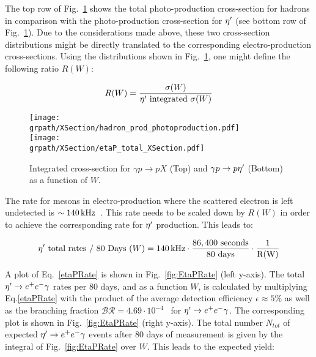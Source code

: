 The top row of Fig.~\ref{fig:EtaPProdX} shows the total photo-production cross-section for hadrons in comparison with the photo-production cross-section for $\eta^{\prime}$ (see bottom row of Fig.~\ref{fig:EtaPProdX}). Due to the considerations made above, these two cross-section distributions might be directly translated to the corresponding electro-production cross-sections. Using the distributions shown in Fig.~\ref{fig:EtaPProdX}, one might define the following ratio $R(W)$:

\begin{equation}
 R(W) = \frac{\sigma(W)}{\eta^{\prime}\text{ integrated } \sigma(W)}
\label{XsecR}
\end{equation}

\begin{figure}[h!]\begin{center}
		\texttt{[image: \\grpath/XSection/hadron\_prod\_photoproduction.pdf]}\\
		\texttt{[image: \\grpath/XSection/etaP\_total\_XSection.pdf]}
		\caption[etaP phot-prod. XSection]{\label{fig:EtaPProdX}{Integrated cross-section for $\gamma p\rightarrow pX$ (Top) and $\gamma p\rightarrow p\eta^{\prime}$ (Bottom) as a function of $W$.}}
\end{center}\end{figure}

The rate for mesons in electro-production where the scattered electron is left undetected is $\sim 140\,\rm{kHz}$~\cite{Sargsyan}. This rate needs to be scaled down by $R(W)$ in order to achieve the corresponding rate for $\eta^{\prime}$ production. This leads to:

\begin{equation}
 \eta^{\prime}\text{ total rates / 80 Days }(W) = 140\,\rm{kHz}\cdot \frac{86,400\mathrm{\ seconds}}{\text{80 days}}\cdot \frac{1}{R(W)}
\label{etaPRate}
\end{equation}

A plot of Eq.~\ref{etaPRate} is shown in Fig.~\ref{fig:EtaPRate} (left y-axis). The total $\eta^{\prime}\rightarrow e^+e^-\gamma$ rates per 80 days, and as a function $W$, is calculated by multiplying Eq.\ref{etaPRate} with the product of the average detection efficiency $\epsilon\approx 5\%$ as well as the branching fraction $\mathcal{BR} = 4.69\cdot10^{-4}$~\cite{BESIII} for $\eta^{\prime}\rightarrow e^+e^-\gamma$. The corresponding plot is shown in Fig.~\ref{fig:EtaPRate} (right y-axis). The total number $N_{tot}$ of expected $\eta^{\prime}\rightarrow e^+e^-\gamma$ events after 80 days of measurement is given by the integral of Fig.~\ref{fig:EtaPRate} over $W$. This leads to the expected yield:

